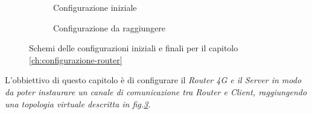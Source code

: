 \newsavebox{\myimagea}
\begin{figure}[H]
    \centering%
    \begin{subfigure}{0.4\textwidth}
        \centering
        \usebox{\myimagea}
        \caption{Configurazione iniziale}
        \label{fig:conf-init-router}
    \end{subfigure}
    \hfill%
    \begin{subfigure}{0.5\textwidth}
        \centering
        \caption{Configurazione da raggiungere}
        \label{fig:conf-final-router}
    \end{subfigure}
    \caption{Schemi delle configurazioni iniziali e finali per il capitolo \ref{ch:configurazione-router}}
\end{figure}

L'obbiettivo di questo capitolo è di configurare il \it{Router 4G} e il \it{Server} in modo da poter instaurare un canale di comunicazione tra \it{Router} e \it{Client}, raggiungendo una topologia virtuale descritta in fig.\ref{fig:conf-final-router}.



